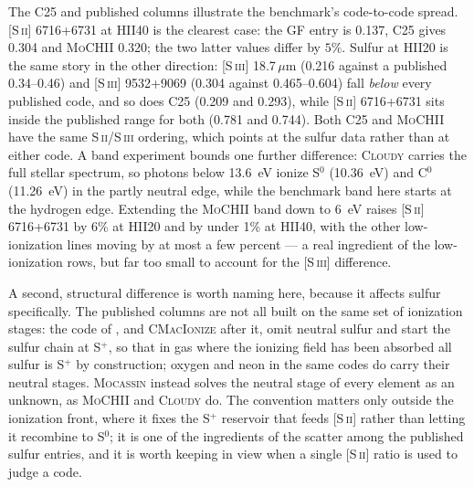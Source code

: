 \documentclass[twocolumn,linenumbers]{aastex702}
\newcommand{\MoCHII}{\textsc{MoCHII}}
\begin{document}
The C25 and published columns illustrate the benchmark's code-to-code
spread.  [S\,\textsc{ii}] 6716+6731 at
HII40 is the clearest case: the GF entry is 0.137, C25 gives 0.304 and
\MoCHII{} 0.320; the two latter values differ by $5\%$.  Sulfur at HII20 is
the same story in the other direction: [S\,\textsc{iii}] 18.7\,$\mu$m
(0.216 against a published 0.34--0.46) and [S\,\textsc{iii}] 9532+9069
(0.304 against 0.465--0.604) fall \emph{below} every published code, and so
does C25 (0.209 and 0.293), while [S\,\textsc{ii}] 6716+6731 sits inside the
published range for both (0.781 and 0.744).  Both C25 and \MoCHII{} have the
same S\,\textsc{ii}/S\,\textsc{iii} ordering, which points at the sulfur
data rather than at either code.  A band experiment bounds one further
difference: \textsc{Cloudy} carries the full stellar spectrum, so photons
below 13.6~eV ionize S$^{0}$ (10.36~eV) and C$^{0}$ (11.26~eV) in the
partly neutral edge, while the benchmark band here starts at the hydrogen
edge.  Extending the \MoCHII{} band down to 6~eV raises
[S\,\textsc{ii}] 6716+6731 by 6\% at HII20 and by under 1\% at HII40, with
the other low-ionization lines moving by at most a few percent --- a real
ingredient of the low-ionization rows, but far too small to account for the
[S\,\textsc{iii}] difference.

A second, structural difference is worth naming here, because it affects
sulfur specifically.  The published columns are not all built on the same
set of ionization stages: the code of \citet{wood2004}, and
\textsc{CMacIonize} after it, omit neutral sulfur and start the sulfur
chain at S$^{+}$, so that in gas where the ionizing field has been absorbed
all sulfur is S$^{+}$ by construction; oxygen and neon in the same codes do
carry their neutral stages.  \textsc{Mocassin} instead solves the neutral
stage of every element as an unknown, as \MoCHII{} and \textsc{Cloudy} do.
The convention matters only outside the ionization front, where it fixes
the S$^{+}$ reservoir that feeds [S\,\textsc{ii}] rather than letting it
recombine to S$^{0}$; it is one of the ingredients of the scatter among the
published sulfur entries, and it is worth keeping in view when a single
[S\,\textsc{ii}] ratio is used to judge a code.
\end{document}
